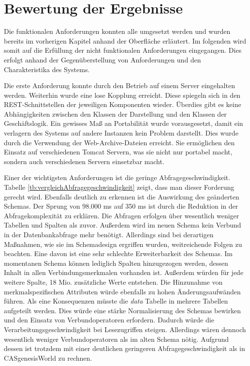 \section{Bewertung der Ergebnisse}
\label{ch:Ergebnis:sec:bewertung}

Die funktionalen Anforderungen konnten alle umgesetzt werden und wurden bereits im vorherigen Kapitel anhand der Oberfläche erläutert. Im folgenden wird somit auf die Erfüllung der nicht funktionalen Anforderungen eingegangen. Dies erfolgt anhand der Gegenüberstellung von Anforderungen und den Charakteristika des Systems.

Die erste Anforderung konnte durch den Betrieb auf einem Server eingehalten werden. Weiterhin wurde eine lose Kopplung erreicht. Diese spiegeln sich in den REST-Schnittstellen der jeweiligen Komponenten wieder. Überdies gibt es keine Abhängigkeiten zwischen den Klassen der Darstellung und den Klassen der Geschäftslogik. Ein gewisses Maß an Portabilität wurde vorausgesetzt, damit ein verlagern des Systems auf andere Instanzen kein Problem darstellt. Dies wurde durch die Verwendung der Web-Archive-Dateien erreicht. Sie ermöglichen den Einsatz auf verschiedenen Tomcat Servern, was sie nicht nur portabel macht, sondern auch verschiedenen Servern einsetzbar macht. 

Einer der wichtigsten Anforderungen ist die geringe Abfragegeschwindigkeit. Tabelle \ref{tb:vergleichAbfragegeschwindigkeit} zeigt, dass man dieser Forderung gerecht wird. Ebenfalls deutlich zu erkennen ist die Auswirkung des geänderten Schemas. Der Sprung von 98.000 ms auf 350 ms ist durch die Reduktion in der Abfragekomplexität zu erklären. Die Abfragen erfolgen über wesentlich weniger Tabellen und Spalten als zuvor. Außerdem wird im neuen Schema kein Verbund in der Datenbankabfrage mehr benötigt. Allerdings sind bei derartigen Maßnahmen, wie sie im Schemadesign ergriffen wurden, weitreichende Folgen zu beachten. Eine davon ist eine sehr schlechte Erweiterbarkeit des Schemas. Im momentanen Schema können lediglich Spalten hinzugezogen werden, dessen Inhalt in allen Verbindungsmerkmalen vorhanden ist. Außerdem würden für jede weitere Spalte, 18 Mio. zusätzliche Werte entstehen. Die Hinzunahme von merkmalspezifischen Attributen würde ebenfalls zu hohen Änderungsaufwänden führen. Als eine Konsequenzen müsste die \textit{data} Tabelle in mehrere Tabellen aufgeteilt werden. Dies würde eine stärke Normalisierung des Schemas bewirken und den Einsatz von Verbundoperatoren erfordern. Dadurch würde die Verarbeitungsgeschwindigkeit bei Lesezugriffen steigen. Allerdings wären dennoch wesentlich weniger Verbundoperatoren als im alten Schema nötig. Aufgrund dessen ist trotzdem mit einer deutlichen geringeren Abfragegeschwindigkeit als in CASgenesisWorld zu rechnen.  


